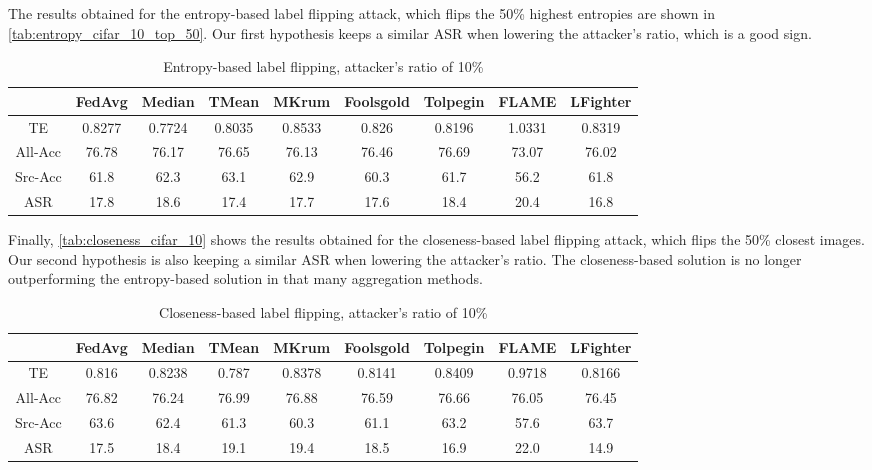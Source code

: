 The results obtained for the entropy-based label flipping attack, which flips the 50\% highest entropies are shown in \autoref{tab:entropy_cifar_10_top_50}. Our first hypothesis keeps a similar ASR when lowering the attacker's ratio, which is a good sign.
\begin{table}[h!]
    \centering
    \small
    \begin{adjustbox}{center}
    \begin{tabular}{|c|c|c|c|c|c|c|c|c|}
        \hline
        & FedAvg & Median & TMean & MKrum & Foolsgold & Tolpegin & FLAME & LFighter \\
        \hline
        TE & 0.8277 & 0.7724 & 0.8035 & 0.8533 & 0.826 & 0.8196 & 1.0331 & 0.8319 \\
        \hline
        All-Acc & 76.78 & 76.17 & 76.65 & 76.13 & 76.46 & 76.69 & 73.07 & 76.02 \\
        \hline
        Src-Acc & 61.8 & 62.3 & 63.1 & 62.9 & 60.3 & 61.7 & 56.2 & 61.8 \\
        \hline
        ASR & 17.8 & 18.6 & 17.4 & 17.7 & 17.6 & 18.4 & 20.4 & 16.8 \\
        \hline
    \end{tabular}
    \end{adjustbox}
    \caption{Entropy-based label flipping, attacker's ratio of 10\%}
    \label{tab:entropy_cifar_10_top_50}
\end{table}


Finally, \autoref{tab:closeness_cifar_10} shows the results obtained for the closeness-based label flipping attack, which flips the 50\% closest images. Our second hypothesis is also keeping a similar ASR when lowering the attacker's ratio. The closeness-based solution is no longer outperforming the entropy-based solution in that many aggregation methods.

\begin{table}[h!]
    \centering
    \small
    \begin{adjustbox}{center}
    \begin{tabular}{|c|c|c|c|c|c|c|c|c|}
        \hline
        & FedAvg & Median & TMean & MKrum & Foolsgold & Tolpegin & FLAME & LFighter \\
        \hline
        TE & 0.816 & 0.8238 & 0.787 & 0.8378 & 0.8141 & 0.8409 & 0.9718 & 0.8166 \\
        \hline
        All-Acc & 76.82 & 76.24 & 76.99 & 76.88 & 76.59 & 76.66 & 76.05 & 76.45 \\
        \hline
        Src-Acc & 63.6 & 62.4 & 61.3 & 60.3 & 61.1 & 63.2 & 57.6 & 63.7 \\
        \hline
        ASR & 17.5 & 18.4 & 19.1 & 19.4 & 18.5 & 16.9 & 22.0 & 14.9 \\
        \hline
    \end{tabular}
    \end{adjustbox}
    \caption{Closeness-based label flipping, attacker's ratio of 10\%}
    \label{tab:closeness_cifar_10}
\end{table}

